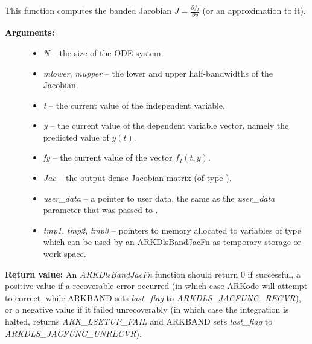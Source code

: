 \documentclass[letterpaper,10pt,english]{sphinxmanual}
\begin{document}
\begin{fulllineitems}
\label{c_interface/User_supplied:ARKDlsBandJacFn}
This function computes the banded Jacobian $J =
\frac{\partial f_I}{\partial y}$ (or an approximation to it).
\begin{description}
\item[{\textbf{Arguments:}}] \leavevmode\begin{itemize}
\item {} 
\emph{N} -- the size of the ODE system.

\item {} 
\emph{mlower}, \emph{mupper} -- the lower and upper half-bandwidths of
the Jacobian.

\item {} 
\emph{t} -- the current value of the independent variable.

\item {} 
\emph{y} -- the current value of the dependent variable vector, namely
the predicted value of $y(t)$.

\item {} 
\emph{fy} -- the current value of the vector $f_I(t,y)$.

\item {} 
\emph{Jac} -- the output dense Jacobian matrix (of type ).

\item {} 
\emph{user\_data} -- a pointer to user data, the same as the
\emph{user\_data} parameter that was passed to {\hyperref[c_interface/User_callable:ARKodeSetUserData]{}}.

\item {} 
\emph{tmp1}, \emph{tmp2}, \emph{tmp3} -- pointers to memory allocated to
variables of type  which can be used by an
ARKDlsBandJacFn as temporary storage or work space.

\end{itemize}

\end{description}

\textbf{Return value:}
An \emph{ARKDlsBandJacFn} function should return 0 if
successful, a positive value if a recoverable error occurred (in
which case ARKode will attempt to correct, while ARKBAND
sets \emph{last\_flag} to \emph{ARKDLS\_JACFUNC\_RECVR}), or a negative
value if it failed unrecoverably (in which case the integration is
halted, {\hyperref[c_interface/User_callable:ARKode]{}} returns \emph{ARK\_LSETUP\_FAIL} and
ARKBAND sets \emph{last\_flag} to \emph{ARKDLS\_JACFUNC\_UNRECVR}).


\end{fulllineitems}
\end{document}
